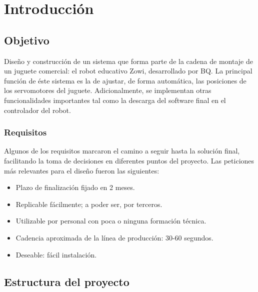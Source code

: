 
\chapter{Introducción} %

\label{Chapter1} %


\section{Objetivo}

Diseño y construcción de un sistema que forma parte de la cadena de montaje de un juguete comercial: el robot educativo Zowi, desarrollado por BQ. La principal función de éste sistema es la de ajustar, de forma automática, las posiciones de los servomotores del juguete. Adicionalmente, se implementan otras funcionalidades importantes tal como la descarga del software final en el controlador del robot.

\subsection{Requisitos}

Algunos de los requisitos marcaron el camino a seguir hasta la solución final, facilitando la toma de decisiones en diferentes puntos del proyecto. Las peticiones más relevantes para el diseño fueron las siguientes:
\begin{itemize}
  \item Plazo de finalización fijado en 2 meses.
  \item Replicable fácilmente; a poder ser, por terceros.
  \item Utilizable por personal con poca o ninguna formación técnica.
  \item Cadencia aproximada de la línea de producción: 30-60 segundos.
  \item Deseable: fácil instalación.
\end{itemize}

\section{Estructura del proyecto}

